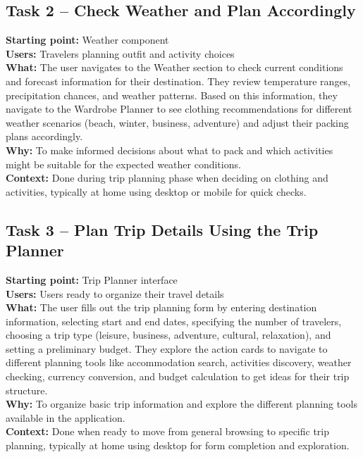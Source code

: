 \documentclass[11pt,a4paper]{article}
\begin{document}
\subsection*{Task 2 – Check Weather and Plan Accordingly}
\textbf{Starting point:} Weather component \\
\textbf{Users:} Travelers planning outfit and activity choices \\
\textbf{What:} The user navigates to the Weather section to check current conditions and forecast information for their destination. They review temperature ranges, precipitation chances, and weather patterns. Based on this information, they navigate to the Wardrobe Planner to see clothing recommendations for different weather scenarios (beach, winter, business, adventure) and adjust their packing plans accordingly. \\
\textbf{Why:} To make informed decisions about what to pack and which activities might be suitable for the expected weather conditions. \\
\textbf{Context:} Done during trip planning phase when deciding on clothing and activities, typically at home using desktop or mobile for quick checks.

\subsection*{Task 3 – Plan Trip Details Using the Trip Planner}
\textbf{Starting point:} Trip Planner interface \\
\textbf{Users:} Users ready to organize their travel details \\
\textbf{What:} The user fills out the trip planning form by entering destination information, selecting start and end dates, specifying the number of travelers, choosing a trip type (leisure, business, adventure, cultural, relaxation), and setting a preliminary budget. They explore the action cards to navigate to different planning tools like accommodation search, activities discovery, weather checking, currency conversion, and budget calculation to get ideas for their trip structure. \\
\textbf{Why:} To organize basic trip information and explore the different planning tools available in the application. \\
\textbf{Context:} Done when ready to move from general browsing to specific trip planning, typically at home using desktop for form completion and exploration.
\end{document}
